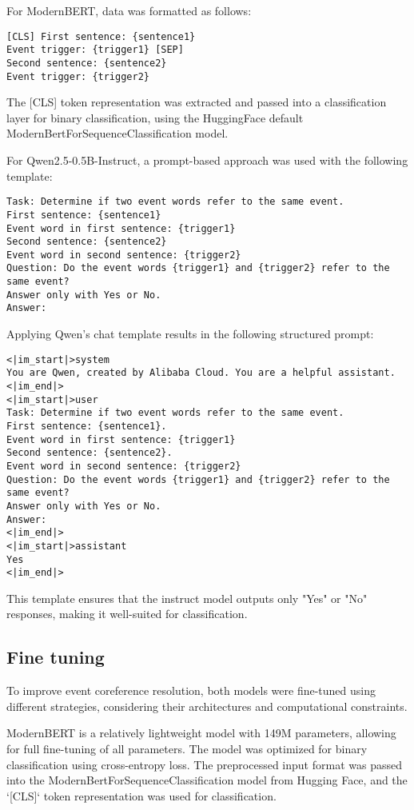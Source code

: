 \documentclass[12pt,a4paper]{article}
\begin{document}
For ModernBERT, data was formatted as follows:

\begin{verbatim}
[CLS] First sentence: {sentence1}
Event trigger: {trigger1} [SEP] 
Second sentence: {sentence2}
Event trigger: {trigger2}
\end{verbatim}

The [CLS] token representation was extracted and passed into a classification layer for binary classification, using the HuggingFace default ModernBertForSequenceClassification model.

For Qwen2.5-0.5B-Instruct, a prompt-based approach was used with the following template:

\begin{verbatim}
Task: Determine if two event words refer to the same event.
First sentence: {sentence1}
Event word in first sentence: {trigger1}
Second sentence: {sentence2}
Event word in second sentence: {trigger2}
Question: Do the event words {trigger1} and {trigger2} refer to the same event? 
Answer only with Yes or No.
Answer:
\end{verbatim}

Applying Qwen's chat template results in the following structured prompt:

\begin{verbatim}
<|im_start|>system
You are Qwen, created by Alibaba Cloud. You are a helpful assistant.
<|im_end|>
<|im_start|>user
Task: Determine if two event words refer to the same event.
First sentence: {sentence1}.
Event word in first sentence: {trigger1}
Second sentence: {sentence2}.
Event word in second sentence: {trigger2}
Question: Do the event words {trigger1} and {trigger2} refer to the same event?
Answer only with Yes or No.
Answer:
<|im_end|>
<|im_start|>assistant
Yes
<|im_end|>
\end{verbatim}

This template ensures that the instruct model outputs only "Yes" or "No" responses, making it well-suited for classification.

\subsection{Fine tuning}

To improve event coreference resolution, both models were fine-tuned using different strategies, considering their architectures and computational constraints.

ModernBERT is a relatively lightweight model with 149M parameters, allowing for full fine-tuning of all parameters. The model was optimized for binary classification using cross-entropy loss. The preprocessed input format was passed into the ModernBertForSequenceClassification model from Hugging Face, and the `[CLS]` token representation was used for classification.
\end{document}
